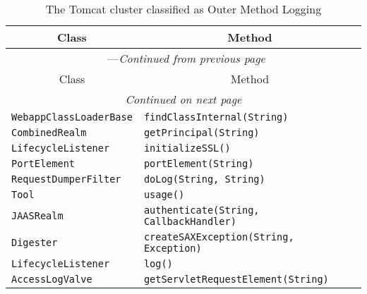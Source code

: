 \begin{center}
\begin{longtable}{ll}
\end{longtable}
\end{center}

\begin{center}
\begin{longtable}{ll}
\caption{The Tomcat cluster classified as Outer Method Logging}\\
\toprule\multicolumn{1}{c}{Class}&\multicolumn{1}{c}{Method}\\\midrule
\endfirsthead

\multicolumn{2}{c}{\tablename\ \thetable{}---\textit{Continued from previous page}} \\\midrule
\multicolumn{1}{c}{Class}&\multicolumn{1}{c}{Method}\\\midrule
\endhead
\multicolumn{2}{c}{\textit{Continued on next page}}\\\midrule
\endfoot
\bottomrule
\endlastfoot

\lstinline/WebappClassLoaderBase/&{\lstinline/findClassInternal(String)/}\\
\lstinline/CombinedRealm/&{\lstinline/getPrincipal(String)/}\\
\lstinline/LifecycleListener/&{\lstinline/initializeSSL()/}\\
\lstinline/PortElement/&{\lstinline/portElement(String)/}\\
\lstinline/RequestDumperFilter/&{\lstinline/doLog(String, String)/}\\
\lstinline/Tool/&{\lstinline/usage()/}\\
\lstinline/JAASRealm/&{\lstinline/authenticate(String, CallbackHandler)/}\\
\lstinline/Digester/&{\lstinline/createSAXException(String, Exception)/}\\
\lstinline/LifecycleListener/&{\lstinline/log()/}\\
\lstinline/AccessLogValve/&{\lstinline/getServletRequestElement(String)/}\\
\end{longtable}
\end{center}

